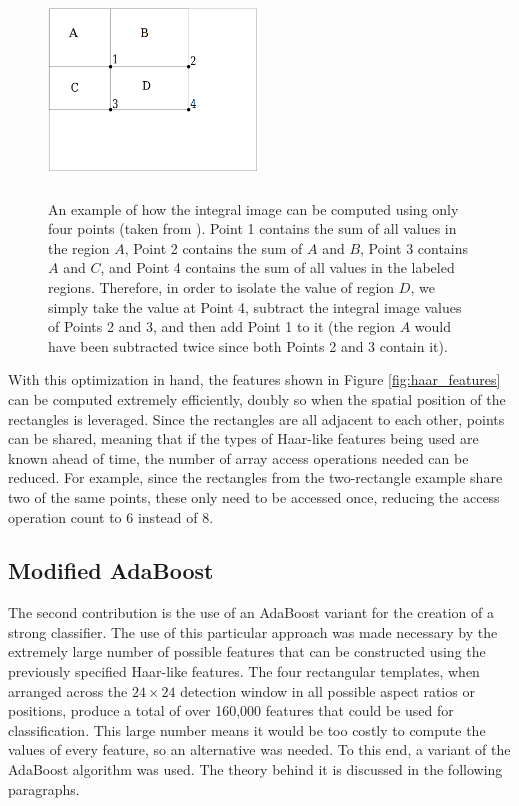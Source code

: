 \documentclass[11pt,a4paper,oldfontcommands]{memoir}
\begin{document}
\begin{figure}
    \centering
    \includegraphics[width=15em, height=15em]{Images/integral_image.png}
    \caption{An example of how the integral image can be computed using only four points (taken from \cite{viola}). Point 1 contains the sum of all values in the region $A$, Point 2 contains the sum of $A$ and $B$, Point 3 contains $A$ and $C$, and Point 4 contains the sum of all values in the labeled regions. Therefore, in order to isolate the value of region $D$, we simply take the value at Point 4, subtract the integral image values of Points 2 and 3, and then add Point 1 to it (the region $A$ would have been subtracted twice since both Points 2 and 3 contain it).}
    \label{fig:integral_computations}
\end{figure}

With this optimization in hand, the features shown in Figure \ref{fig:haar_features} can be computed extremely efficiently, doubly so when the spatial position of the rectangles is leveraged. Since the rectangles are all adjacent to each other, points can be shared, meaning that if the types of Haar-like features being used are known ahead of time, the number of array access operations needed can be reduced. For example, since the rectangles from the two-rectangle example share two of the same points, these only need to be accessed once, reducing the access operation count to 6 instead of 8. 

\subsection{Modified AdaBoost}
The second contribution is the use of an AdaBoost \cite{adaboost} variant for the creation of a strong classifier. The use of this particular approach was made necessary by the extremely large number of possible features that can be constructed using the previously specified Haar-like features. The four rectangular templates, when arranged across the $24 \times 24$ detection window in all possible aspect ratios or positions, produce a total of over 160,000 features \cite{viola_updated} that could be used for classification. This large number means it would be too costly to compute the values of every feature, so an alternative was needed. To this end, a variant of the AdaBoost algorithm was used. The theory behind it is discussed in the following paragraphs.
\end{document}
